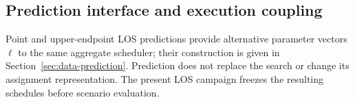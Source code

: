 \subsection{Prediction interface and execution coupling}

Point and upper-endpoint LOS predictions provide alternative parameter
vectors $\ell$ to the same aggregate scheduler; their construction is given
in Section~\ref{sec:data-prediction}. Prediction does not replace the search
or change its assignment representation. The present LOS campaign freezes
the resulting schedules before scenario evaluation.



